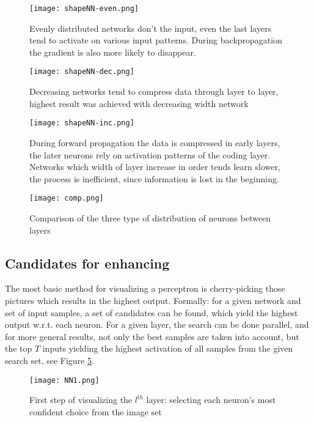 \begin{figure}
    \centering
    \texttt{[image: shapeNN-even.png]}
    \caption{Evenly distributed networks don't the input, even the last layers tend to activate on various input patterns. During backpropagation the gradient is also more likely to disappear.}
    \label{fig:even}
\end{figure}
\begin{figure}
    \centering
    \texttt{[image: shapeNN-dec.png]}
    \caption{Decreasing networks tend to compress data through layer to layer, highest result was achieved with decreasing width network}
    \label{fig:dec}
\end{figure}
\begin{figure}
    \centering
    \texttt{[image: shapeNN-inc.png]}
    \caption{During forward propagation the data is compressed in early layers, the later neurons rely on activation patterns of the coding layer. Networks which width of layer increase in order tends learn slower, the process is inefficient, since information is lost in the beginning.}
    \label{fig:inc}
\end{figure}

\begin{figure}
    \centering
    \texttt{[image: comp.png]}
    \caption{Comparison of the three type of distribution of neurons between layers}
    \label{fig:comp}
\end{figure}


\subsection{Candidates for enhancing}
\label{method}
The most basic method for visualizing a perceptron is cherry-picking those pictures which results in the highest output.
Formally: for a given network and set of input samples, a set of candidates can be found, which yield the highest output w.r.t. each neuron. 
For a given layer, the search can be done parallel, and for more general results, not only the best samples are taken into account, but the top $T$ inputs yielding the highest activation of all samples from the given search set, see Figure \ref{fig:ga-method1}. 
\begin{figure}
    \centering
    \texttt{[image: NN1.png]}
    \caption{First step of visualizing the $l^{th}$ layer: selecting each neuron's most confident choice from the image set}
    \label{fig:ga-method1}
\end{figure}

